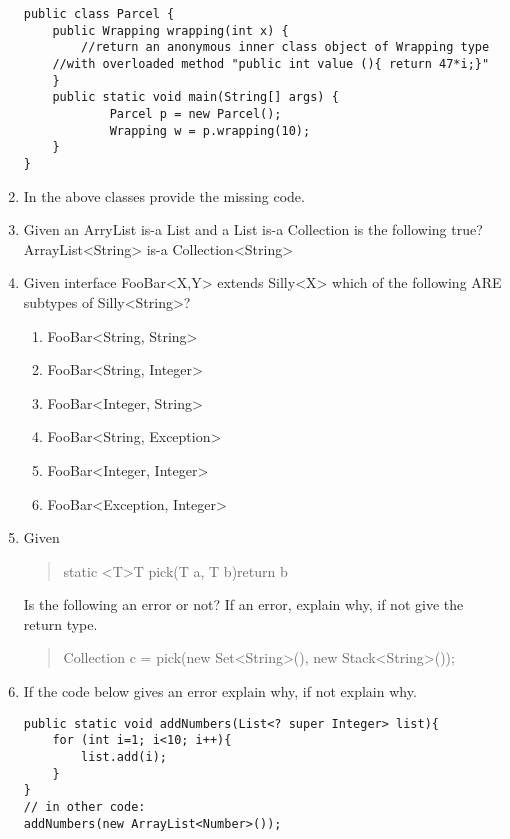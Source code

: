 \documentclass{article}
\begin{document}
\begin{enumerate}
\begin{lstlisting}
public class Parcel {
  	public Wrapping wrapping(int x) {
    	//return an anonymous inner class object of Wrapping type
   	//with overloaded method "public int value (){ return 47*i;}"
  	}
  	public static void main(String[] args) {
    		Parcel p = new Parcel();
    		Wrapping w = p.wrapping(10);
  	}
}
\end{lstlisting}
	\item In the above classes provide the missing code.\newline\newline\newline\newline\newline\newline
	\item Given an ArryList is-a List and a List is-a Collection is the following true? ArrayList<String> is-a Collection<String>\newline\newline
	\item Given interface FooBar<X,Y> extends Silly<X> which of the following ARE subtypes of Silly<String>?
	\begin{enumerate}
		\item FooBar<String, String>
		\item FooBar<String, Integer>
		\item FooBar<Integer, String>
		\item FooBar<String, Exception>
		\item FooBar<Integer, Integer>
		\item FooBar<Exception, Integer>
	\end{enumerate}
	\item Given
	\begin{quote}
		static \textless T\textgreater T pick(T a, T b){return b}
	\end{quote}
	Is the following an error or not? If an error, explain why, if not give the return type.
	\begin{quote}
		Collection c = pick(new Set\textless String\textgreater (), new Stack\textless String\textgreater());
	\end{quote}\newpage
	\item If the code below gives an error explain why, if not explain why.
\begin{lstlisting}
public static void addNumbers(List<? super Integer> list){
	for (int i=1; i<10; i++){
		list.add(i);
	}
}
// in other code:
addNumbers(new ArrayList<Number>());
\end{lstlisting}

\end{enumerate}
\end{document}
